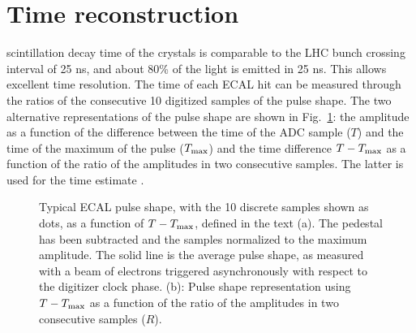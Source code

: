 \documentclass[journal]{IEEEtran}
\begin{document}
\section{Time reconstruction}
\label{sec:timereco}
 scintillation decay time of the crystals is comparable to the LHC bunch crossing interval of 25 ns, and about 80\% of the light is emitted in 25 ns. This allows excellent time resolution. The time of each ECAL hit can be measured through the ratios of the consecutive 10 digitized samples of the pulse shape. The two alternative representations of the pulse shape are shown in Fig.~\ref{fig:pulse_shapes_funcs}: the amplitude as a function of the difference between the time of the ADC sample ($T$) and the time of the maximum of the pulse ($T_{\rm max}$) and the time difference $T-T_{\rm max}$ as a function of the ratio of the amplitudes in two consecutive samples. The latter is used for the time estimate \cite{Chatrchyan:2009aj}.  
%
\begin{figure}[!t]
  \begin{center}
    \caption{Typical ECAL pulse shape, with the 10 discrete samples shown as dots, as a function of $T-T_{\rm max}$, defined in the text (a). The pedestal has been subtracted and the samples normalized to the maximum amplitude. The solid line is the average pulse shape, as measured with a beam of electrons triggered asynchronously with respect to the digitizer clock phase. (b): Pulse shape representation using $T-T_{\rm max}$ as a function of the ratio of the amplitudes in two consecutive samples ($R$). \label{fig:pulse_shapes_funcs}}
  \end{center}
\end{figure}
%
\end{document}
